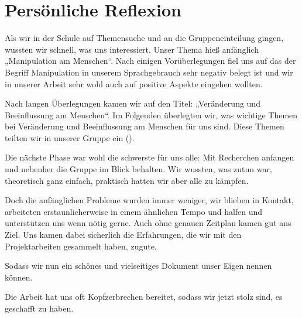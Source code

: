 \chapter{Persönliche Reflexion}
\label{sec:reflexion}

Als wir in der Schule auf Themensuche und an die Gruppeneinteilung gingen, wussten wir schnell, was
uns interessiert. Unser Thema hieß anfänglich „Manipulation am Menschen“. Nach einigen
Vorüberlegungen fiel uns auf das der Begriff Manipulation in unserem Sprachgebrauch sehr negativ
belegt ist und wir in unserer Arbeit sehr wohl auch auf positive Aspekte eingehen wollten.

Nach langen Überlegungen kamen wir auf den Titel: „Veränderung und Beeinflussung am Menschen“. Im
Folgenden überlegten wir, was wichtige Themen bei Veränderung und Beeinflussung am Menschen für uns
sind. Diese Themen teilten wir in unserer Gruppe ein ().

Die nächste Phase war wohl die schwerste für uns alle: Mit Recherchen anfangen und nebenher die
Gruppe im Blick behalten. Wir wussten, was zutun war, theoretisch ganz einfach, praktisch hatten
wir aber alle zu kämpfen.

Doch die anfänglichen Probleme wurden immer weniger, wir blieben in Kontakt, arbeiteten
erstaunlicherweise in einem ähnlichen Tempo und halfen und unterstützen uns wenn nötig gerne. Auch
ohne genauen Zeitplan kamen gut ans Ziel. Uns kamen dabei sicherlich die
Erfahrungen, die wir mit den Projektarbeiten gesammelt haben, zugute.

Sodass wir nun ein schönes und vielseitiges Dokument unser Eigen nennen können.

Die Arbeit hat uns oft Kopfzerbrechen bereitet, sodass wir jetzt stolz sind, es geschafft zu haben.

\begin{comment}
\begin{figurewrapper}
	\texttt{[image: files/images/Gruppenfotos/IMG\_8096\\imageresize]}
	\captionof{figure}{Gruppenfoto von uns}
	\label{fig:group_picture}
\end{figurewrapper}
\end{comment}
